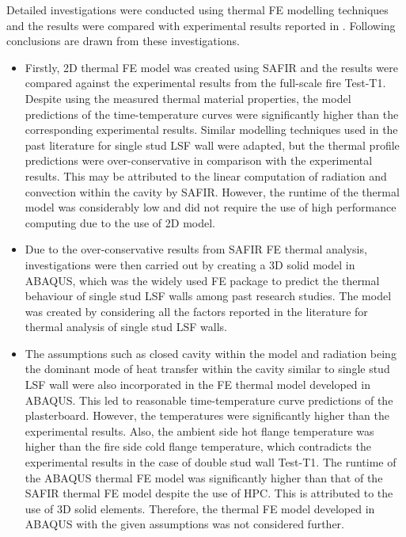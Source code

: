 Detailed investigations were conducted using thermal FE modelling techniques and the results were compared with experimental results reported in . Following conclusions are drawn from these investigations. 
\begin{itemize}
	\item Firstly, 2D thermal FE model was created using SAFIR and the results were compared against the experimental results from the full-scale fire Test-T1. Despite using the measured thermal material properties, the model predictions of the time-temperature curves were significantly higher than the corresponding experimental results. Similar modelling techniques used in the past literature for single stud LSF wall were adapted, but the thermal profile predictions were over-conservative in comparison with the experimental results. This may be attributed to the linear computation of radiation and convection within the cavity by SAFIR. However, the runtime of the thermal model was considerably low and did not require the use of high performance computing due to the use of 2D model.
	\item Due to the over-conservative results from SAFIR FE thermal analysis, investigations were then carried out by creating a 3D solid model in ABAQUS, which was the widely used FE package to predict the thermal behaviour of single stud LSF walls among past research studies. The model was created by considering all the factors reported in the literature for thermal analysis of single stud LSF walls. 
	\item The assumptions such as closed cavity within the model and radiation being the dominant mode of heat transfer within the cavity similar to single stud LSF wall were also incorporated in the FE thermal model developed in ABAQUS. This led to reasonable time-temperature curve predictions of the plasterboard. However, the temperatures were significantly higher than the experimental results. Also, the ambient side hot flange temperature was higher than the fire side cold flange temperature, which contradicts the experimental results in the case of double stud wall Test-T1. The runtime of the ABAQUS thermal FE model was significantly higher than that of the SAFIR thermal FE model despite the use of HPC. This is attributed to the use of 3D solid elements. Therefore, the thermal FE model developed in ABAQUS with the given assumptions was not considered further. 

\end{itemize}
